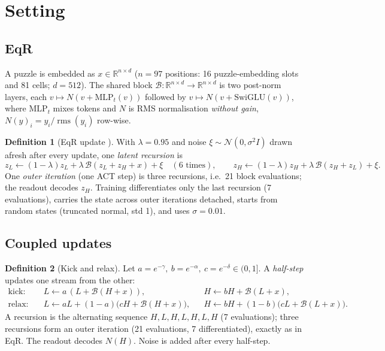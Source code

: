 \documentclass[11pt]{article}
\theoremstyle{definition}
\newtheorem{definition}{Definition}
\newcommand{\R}{\mathbb{R}}
\newcommand{\rms}{\operatorname{rms}}
\newcommand{\zH}{z_H}
\newcommand{\zL}{z_L}
\newcommand{\Bk}{\mathcal{B}}
\begin{document}
\section{Setting}\label{sec:setting}

\subsection{EqR}
A puzzle is embedded as $x\in\R^{n\times d}$ ($n=97$ positions: 16 puzzle-embedding slots and 81 cells; $d=512$). The
shared block $\Bk:\R^{n\times d}\to\R^{n\times d}$ is two post-norm layers, each $v\mapsto N(v+\mathrm{MLP}_t(v))$ followed by
$v\mapsto N(v+\mathrm{SwiGLU}(v))$, where $\mathrm{MLP}_t$ mixes tokens and $N$ is RMS normalisation \emph{without gain},
$N(y)_i = y_i/\rms(y_i)$ row-wise.

\begin{definition}[EqR update {\cite{huang2026eqr}}]
With $\lambda=0.95$ and noise $\xi\sim\mathcal N(0,\sigma^2 I)$ drawn afresh after every update, one \emph{latent recursion} is
\[
\zL \leftarrow (1-\lambda)\zL + \lambda\,\Bk(\zL+\zH+x) + \xi\quad(\text{6 times}),\qquad
\zH \leftarrow (1-\lambda)\zH + \lambda\,\Bk(\zH+\zL) + \xi .
\]
One \emph{outer iteration} (one ACT step) is three recursions, i.e.\ 21 block evaluations; the readout decodes $\zH$.
Training differentiates only the last recursion (7 evaluations), carries the state across outer iterations detached,
starts from random states (truncated normal, std 1), and uses $\sigma=0.01$.
\end{definition}

\subsection{Coupled updates}
\begin{definition}[Kick and relax]\label{def:coupled}
Let $a=e^{-\gamma},\ b=e^{-\alpha},\ c=e^{-\delta}\in(0,1]$. A \emph{half-step} updates one stream from the other:
\begin{align*}
\text{kick:}&\quad L\leftarrow a\,(L+\Bk(H+x)), && H\leftarrow bH+\Bk(L+x),\\
\text{relax:}&\quad L\leftarrow aL+(1-a)\bigl(cH+\Bk(H+x)\bigr), && H\leftarrow bH+(1-b)\bigl(cL+\Bk(L+x)\bigr).
\end{align*}
A recursion is the alternating sequence $H,L,H,L,H,L,H$ (7 evaluations); three recursions form an outer iteration (21 evaluations,
7 differentiated), exactly as in EqR. The readout decodes $N(H)$. Noise is added after every half-step.
\end{definition}
\end{document}
